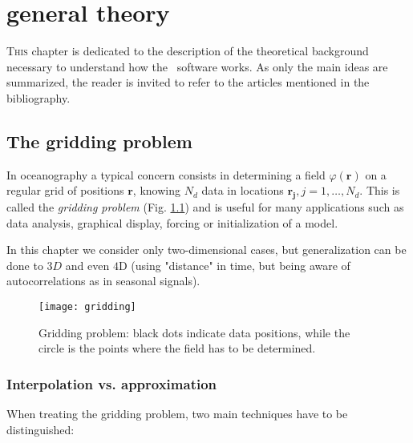 \chapter{\diva\divaspace general theory\label{chaptheory}}
\vspace*{-2cm}
\lettrine[lines=2, loversize=-0.1, lraise=0.1]{T}{his} chapter is dedicated to the description of the theoretical background necessary to understand how the \diva\, software works. As only the main ideas are summarized, the reader is invited to refer to the articles mentioned in the bibliography.

\minitoc


\section{The gridding problem\label{gridding}}

In oceanography a typical concern consists in determining a field $\varphi(\mathbf{r})$ on a regular grid of positions $\mathbf{r}$, knowing $N_{d}$ data in locations $\mathbf{r_{j}}, j=1,\ldots, N_{d}$. This is called the \textit{gridding problem} (Fig. \ref{gridproblem}) and is useful for many applications such as data analysis, graphical display, forcing or initialization of a model.

In this chapter we consider only two-dimensional cases, but generalization can be done to $3D$ and even $4$D (using "distance" in time, but being aware of autocorrelations as in seasonal signals).

\begin{figure}[htpb]
	\centering
	\parbox{.5\textwidth}{
		\texttt{[image: gridding]}
		}\parbox{.5\textwidth}{
		\caption{Gridding problem: black dots indicate data positions, while the circle is the points where the field has to be determined.\label{gridproblem}}
		}
\end{figure}


\subsection{Interpolation vs. approximation}

When treating the gridding problem, two main techniques have to be distinguished:

